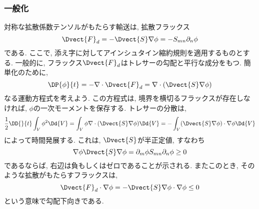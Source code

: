 \subsubsection*{一般化}
対称な拡散係数テンソルがもたらす輸送は, 拡散フラックス
\begin{equation}
  \Dvect{F}_d = - \Dvect{S} \nabla \phi
  = -S_{mn} \partial_n \phi
\end{equation}
である. 
ここで, 添え字に対してアインシュタイン縮約規則を適用するものとする. 
一般的に, フラックス$\Dvect{F}_d$はトレサーの勾配と平行な成分をもつ. 
簡単化のために, 
\begin{equation}
 \DP{\phi}{t} = - \nabla \cdot \Dvect{F}_d 
     = \nabla \cdot (\Dvect{S} \nabla \phi)
\end{equation}
なる運動方程式を考えよう. 
この方程式は, 境界を横切るフラックスが存在しなければ, $\phi$の一次モーメントを保存する. 
トレサーの分散は, 
\begin{equation}
   \dfrac{1}{2} \DD{}{t} \int_V \phi^2 \Dd{V}
 = \int_{V} \phi \nabla \cdot ( \Dvect{S} \nabla \phi) \Dd{V}
 = - \int_V (\Dvect{S}\nabla \phi) \cdot \nabla \phi \Dd{V}
\end{equation}
によって時間発展する. 
これは, $\Dvect{S}$が半正定値, すなわち
\begin{equation}
  \nabla \phi \Dvect{S} \nabla \phi = \partial_m \phi S_{mn} \partial_n \phi \ge 0
\end{equation}
であるならば, 右辺は負もしくはゼロであることが示される. 
またこのとき, そのような拡散がもたらすフラックスは, 
\begin{equation}
  \Dvect{F}_d \cdot \nabla \phi = -\Dvect{S}\nabla\phi \cdot \nabla \phi \le 0
\end{equation}
という意味で勾配下向きである. 

